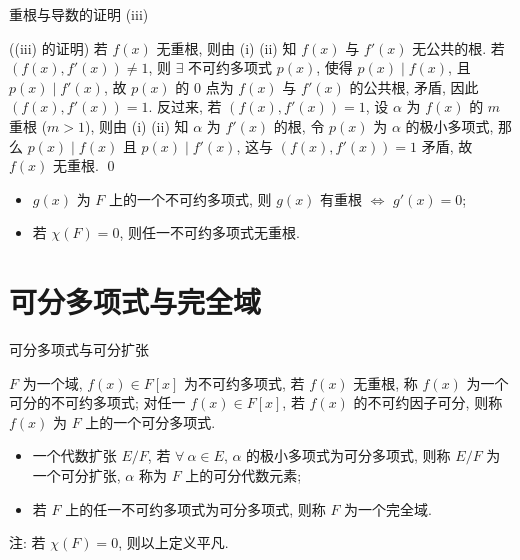 
\begin{frame}{重根与导数的证明 (iii)}

\startproof[bg=yellow, fg=red]((iii) 的证明)
若 $f(x)$ 无重根, 则由 (i) (ii) 知 $f(x)$ 与 $f'(x)$ 无公共的根.
若 $(f(x), f'(x)) \neq 1$, 则 $\exists$ 不可约多项式 $p(x)$,
使得 $p(x) \mid f(x)$, 且 $p(x) \mid f'(x)$,
故 $p(x)$ 的 0 点为 $f(x)$ 与 $f'(x)$ 的公共根, 矛盾,
因此 $(f(x), f'(x)) = 1$.
反过来, 若 $(f(x), f'(x)) = 1$,
设 $\alpha$ 为 $f(x)$ 的 $m$ 重根 ($m > 1$),
则由 (i) (ii) 知 $\alpha$ 为 $f'(x)$ 的根,
令 $p(x)$ 为 $\alpha$ 的极小多项式, 那么 $p(x) \mid f(x)$ 且 $p(x) \mid f'(x)$,
这与 $(f(x), f'(x)) = 1$ 矛盾, 故 $f(x)$ 无重根.
\qed

\pause

\begin{cor}
\begin{itemize}
\item[(i)] $g(x)$ 为 $F$ 上的一个不可约多项式, 则 $g(x)$ 有重根 $\iff$ $g'(x) = 0$;
\item[(ii)] 若 $\chi(F) = 0$, 则任一不可约多项式无重根.
\end{itemize}
\end{cor}

\end{frame}


\section[可分]{可分多项式与完全域}


\begin{frame}{可分多项式与可分扩张}

\begin{Def}[可分多项式与可分扩张]
$F$ 为一个域, $f(x) \in F[x]$ 为不可约多项式, 若 $f(x)$ 无重根,
称 $f(x)$ 为一个可分的不可约多项式;
对任一 $f(x) \in F[x]$, 若 $f(x)$ 的不可约因子可分, 则称 $f(x)$ 为 $F$
上的一个可分多项式.
\end{Def}

\begin{itemize}
\item[(ii)] 一个代数扩张 $E/F$, 若 $\forall\ \alpha \in E$, $\alpha$
  的极小多项式为可分多项式, 则称 $E/F$ 为一个可分扩张,
  $\alpha$ 称为 $F$ 上的可分代数元素;
\item[(iii)] 若 $F$ 上的任一不可约多项式为可分多项式, 则称 $F$ 为一个完全域.
\end{itemize}

\pause

注: 若 $\chi(F) = 0$, 则以上定义平凡.

\end{frame}


